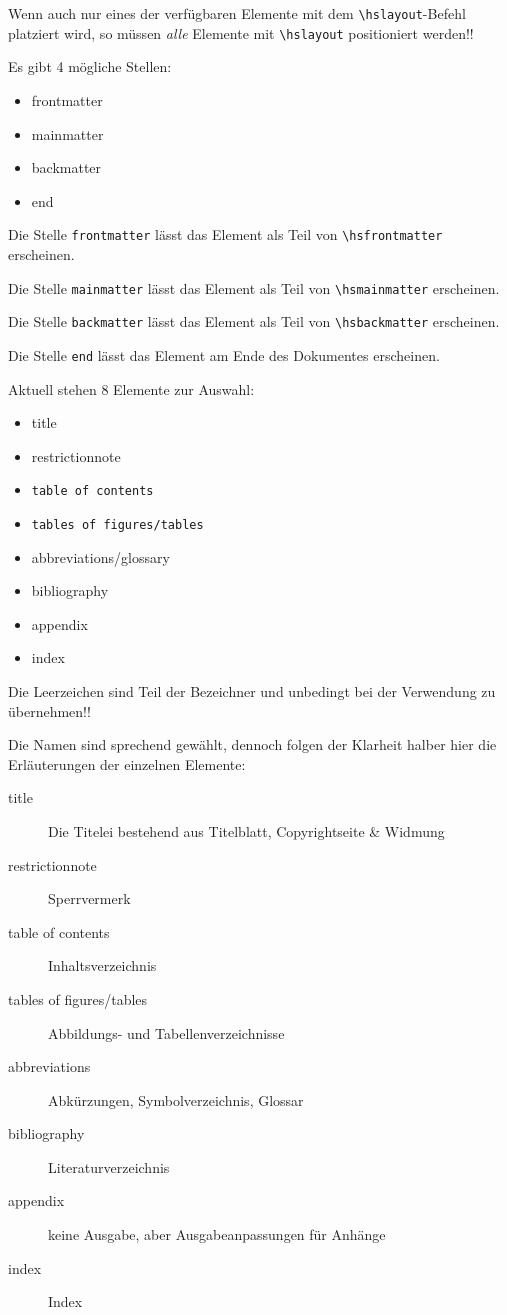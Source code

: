 Wenn auch nur eines der verfügbaren Elemente mit dem
\texttt{\textbackslash{}hslayout}-Befehl platziert wird, so müssen
\emph{alle} Elemente mit \texttt{\textbackslash{}hslayout}
positioniert werden!!

Es gibt 4 mögliche Stellen:

\begin{itemize}\ttfamily
	\item frontmatter
	\item mainmatter
	\item backmatter
	\item end
\end{itemize}

Die Stelle \texttt{frontmatter} lässt das Element als Teil von
\texttt{\textbackslash{}hsfrontmatter} erscheinen.

Die Stelle \texttt{mainmatter} lässt das Element als Teil von
\texttt{\textbackslash{}hsmainmatter} erscheinen.

Die Stelle \texttt{backmatter} lässt das Element als Teil von
\texttt{\textbackslash{}hsbackmatter} erscheinen.

Die Stelle \texttt{end} lässt das Element am Ende des Dokumentes
erscheinen.

Aktuell stehen 8 Elemente zur Auswahl:

\begin{itemize}\ttfamily
	\item title
	\item restrictionnote
	\item \verb*!table of contents!
	\item \verb*!tables of figures/tables!
	\item abbreviations/glossary
	\item bibliography
	\item appendix
	\item index
\end{itemize}

Die Leerzeichen sind Teil der Bezeichner und unbedingt bei der
Verwendung zu übernehmen!!

Die Namen sind sprechend gewählt, dennoch folgen der Klarheit halber hier die
Erläuterungen der einzelnen Elemente:

\begin{description}
	\item[title] Die Titelei bestehend aus Titelblatt, Copyrightseite \& Widmung
	\item[restrictionnote] Sperrvermerk
	\item[table of contents] Inhaltsverzeichnis
	\item[tables of figures/tables] Abbildungs- und Tabellenverzeichnisse
	\item[abbreviations] Abkürzungen, Symbolverzeichnis, Glossar
	\item[bibliography] Literaturverzeichnis
	\item[appendix] keine Ausgabe, aber Ausgabeanpassungen für Anhänge
	\item[index] Index
\end{description}

